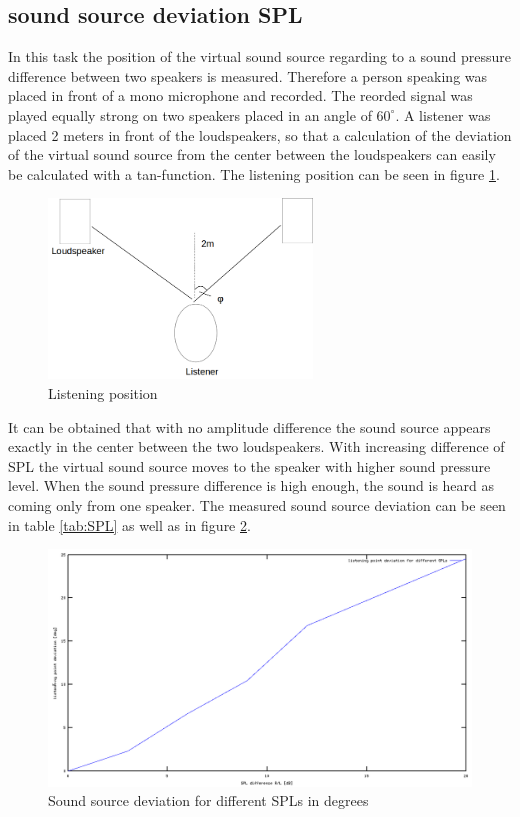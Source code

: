 \documentclass{article}
\begin{document}
\subsection{sound source deviation SPL}
In this task the position of the virtual sound source regarding to a sound pressure difference between two speakers is measured. Therefore a person speaking was placed in front of a mono microphone and recorded. The reorded signal was played equally strong on two speakers placed in an angle of $60^\circ$. A listener was placed 2 meters in front of the loudspeakers, so that a calculation of the deviation of the virtual sound source from the center between the loudspeakers can easily be calculated with a tan-function. The listening position can be seen in figure \ref{fig:listening}.
\begin{figure}[htbp]
\begin{center}
\includegraphics[width=7cm,keepaspectratio=true]{listening}
\caption{Listening position}
\label{fig:listening}
\end{center}
\end{figure}
It can be obtained that with no amplitude difference the sound source appears exactly in the center between the two loudspeakers. With increasing difference of SPL the virtual sound source moves to the speaker with higher sound pressure level. When the sound pressure difference is high enough, the sound is heard as coming only from one speaker. The measured sound source deviation can be seen in table \ref{tab:SPL} as well as in figure \ref{fig:SPL}.
\begin{figure}[htbp]
\begin{center}
\includegraphics[width=15cm,keepaspectratio=true]{SPL}
\caption{Sound source deviation for different SPLs in degrees}
\label{fig:SPL}
\end{center}
\end{figure}
\end{document}
